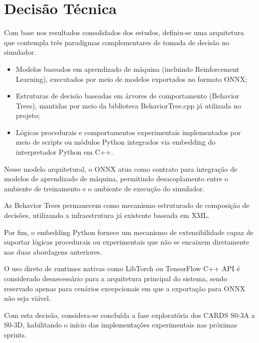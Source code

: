 \section{Decisão Técnica}

Com base nos resultados consolidados dos estudos, definiu-se uma arquitetura que contempla
três paradigmas complementares de tomada de decisão no simulador.

\begin{itemize}

\item Modelos baseados em aprendizado de máquina (incluindo Reinforcement Learning),
executados por meio de modelos exportados no formato ONNX;

\item Estruturas de decisão baseadas em árvores de comportamento (Behavior Trees),
mantidas por meio da biblioteca BehaviorTree.cpp já utilizada no projeto;

\item Lógicas procedurais e comportamentos experimentais implementados por meio
de scripts ou módulos Python integrados via embedding do interpretador Python em C++.

\end{itemize}

Nesse modelo arquitetural, o ONNX atua como contrato para integração de modelos de
aprendizado de máquina, permitindo desacoplamento entre o ambiente de treinamento
e o ambiente de execução do simulador.

As Behavior Trees permanecem como mecanismo estruturado de composição de decisões,
utilizando a infraestrutura já existente baseada em XML.

Por fim, o embedding Python fornece um mecanismo de extensibilidade capaz de suportar
lógicas procedurais ou experimentais que não se encaixem diretamente nas duas
abordagens anteriores.

O uso direto de runtimes nativas como LibTorch ou TensorFlow C++ API é considerado
desnecessário para a arquitetura principal do sistema, sendo reservado apenas para
cenários excepcionais em que a exportação para ONNX não seja viável.

Com esta decisão, considera-se concluída a fase exploratória dos CARDS S0-3A a S0-3D,
habilitando o início das implementações experimentais nas próximas sprints.
